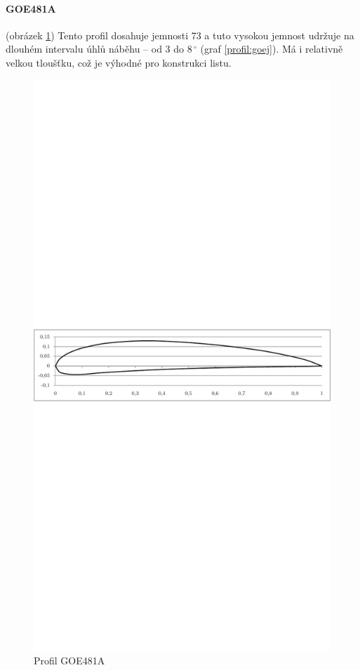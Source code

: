 	\paragraph{GOE481A} (obrázek \ref{profil:goe}) Tento profil dosahuje jemnosti 73 a tuto vysokou jemnost udržuje na dlouhém intervalu úhlů náběhu – od 3 do $8\,^{\circ}$ (graf \ref{profil:goej}). Má i relativně velkou tloušťku, což je výhodné pro konstrukci listu.
	\begin{figure}[H]
			\centering
			\includegraphics[]{obrazky/grafy/goep}
			\caption{Profil GOE481A}
			\label{profil:goe}
		\end{figure}
